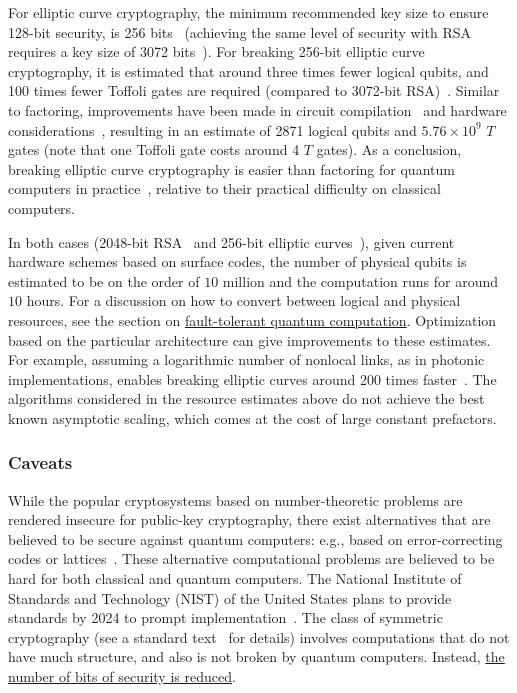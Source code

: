 \begin{refsection}
For elliptic curve cryptography, the minimum recommended key size to ensure 128-bit security, is 256 bits~\cite{barker2015KeyRecommendation} (achieving the same level of security with RSA requires a key size of 3072 bits~\cite{boudot2020Factorization240Digit,roetteler2017ResourceEstimatesEllipticCurve}). 
For breaking 256-bit elliptic curve cryptography, it is estimated that around three times fewer logical qubits, and 100 times fewer Toffoli gates are required (compared to 3072-bit RSA)~\cite{roetteler2017ResourceEstimatesEllipticCurve}. Similar to factoring, improvements have been made in circuit compilation~\cite{haner2020ImprovedEllipticCurve} and hardware considerations~\cite{webber2022HardwareSpecifications}, resulting in an estimate of 2871 logical qubits and $5.76\times 10^9$ $T$ gates (note that one Toffoli gate costs around 4 $T$ gates). As a conclusion, breaking elliptic curve cryptography is easier than factoring for quantum computers in practice~\cite{proos2003ShorEllipticCurves}, relative to their practical difficulty on classical computers. 

In both cases (2048-bit RSA~\cite{gidney2021HowToFactor,ha2022ShorResources} and 256-bit elliptic curves~\cite{webber2022HardwareSpecifications}), given current hardware schemes based on surface codes, the number of physical qubits is estimated to be on the order of $10$ million and the computation runs for around $10$ hours. For a discussion on how to convert between logical and physical resources, see the section on \hyperref[prim:FTQC]{fault-tolerant quantum computation}. Optimization based on the particular architecture can give improvements to these estimates. For example, assuming a logarithmic number of nonlocal links, as in photonic implementations, enables breaking elliptic curves around 200 times faster~\cite{litinski2023EllipticCurvesBaseline}. The algorithms considered in the resource estimates above do not achieve the best known asymptotic scaling, which comes at the cost of large constant prefactors.


\subsubsection*{Caveats}
While the popular cryptosystems based on number-theoretic problems are rendered insecure for public-key cryptography, there exist alternatives that are believed to be secure against quantum computers: e.g., based on error-correcting codes or lattices~\cite{bernstein2017PostQuantumCrypto}. These alternative computational problems are believed to be hard for both classical and quantum computers.
The National Institute of Standards and Technology (NIST) of the United States plans to provide standards by 2024 to prompt implementation~\cite{alagic2022PostQuantumCryptoStatus3}. The class of symmetric cryptography (see a standard text~\cite{katz2021IntroCryptography} for details) involves computations that do not have much structure, and also is not broken by quantum computers. Instead, \hyperref[appl:WeakeningCrypto]{the number of bits of security is reduced}.


\end{refsection}
